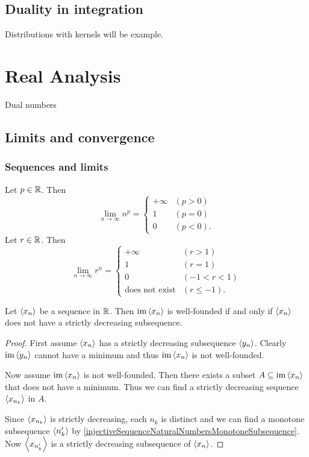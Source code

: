\section{Duality in integration}
Distributions with kernels will be example.




\chapter{Real Analysis}
Dual numbers

\section{Limits and convergence}
\subsection{Sequences and limits}
\begin{example}
Let $p\in\mathbb{R}$. Then
\[ \lim_{n\to\infty} n^p = \begin{cases}
+\infty & (p>0) \\
1 & (p=0) \\
0 & (p<0).
\end{cases} \]
Let $r\in\mathbb{R}$. Then
\[ \lim_{n\to\infty} r^n = \begin{cases}
+\infty & (r>1) \\
1 & (r=1) \\
0 & (-1<r<1) \\
\text{does not exist} & (r\leq -1).
\end{cases} \]
\end{example}

\begin{lemma} \label{sequenceWellFoundedIffNoDecreasingSubsequence}
Let $\left\langle x_n \right\rangle$ be a sequence in $\mathbb{R}$. Then $\operatorname{im}\left\langle x_n \right\rangle$ is well-founded \textup{if and only if} $\left\langle x_n \right\rangle$ does not have a strictly decreasing subsequence.
\end{lemma}
\begin{proof}
First assume $\left\langle x_n \right\rangle$ has a strictly decreasing subsequence $\left\langle y_n \right\rangle$. Clearly $\operatorname{im}\left\langle y_n \right\rangle$ cannot have a minimum and thus $\operatorname{im}\left\langle x_n \right\rangle$ is not well-founded.

Now assume $\operatorname{im}\left\langle x_n \right\rangle$ is not well-founded. Then there exists a subset $A\subseteq \operatorname{im}\left\langle x_n \right\rangle$ that does not have a minimum. Thus we can find a strictly decreasing sequence $\left\langle x_{n_k} \right\rangle$ in $A$.

Since $\left\langle x_{n_k} \right\rangle$ is strictly decreasing, each $n_k$ is distinct and we can find a monotone subsequence $\left\langle n'_k \right\rangle$ by \ref{injectiveSequenceNaturalNumbersMonotoneSubsequence}. Now $\left\langle x_{n'_k} \right\rangle$ is a strictly decreasing subsequence of $\left\langle x_n \right\rangle$.
\end{proof}

